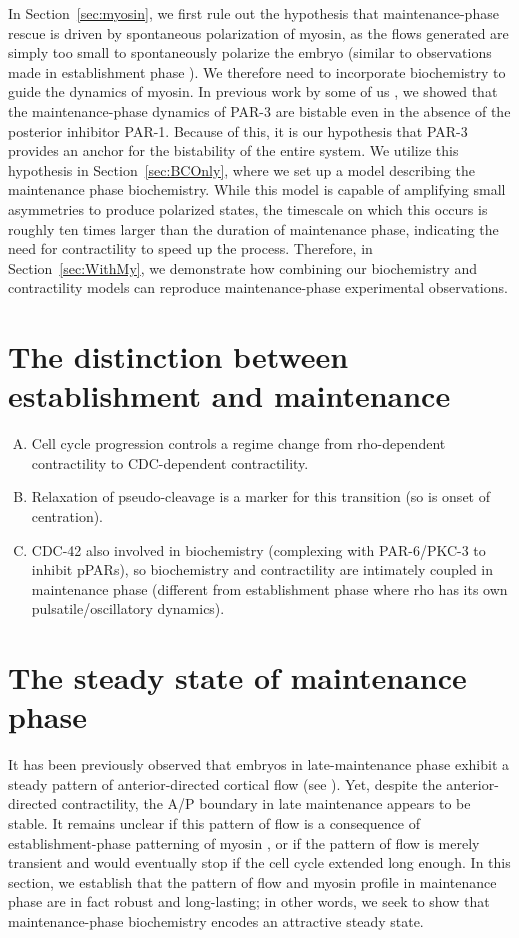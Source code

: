 \documentclass[11pt]{article}
\newcommand{\6}[1]{#1_{\text{6}}}
\newcommand{\3}[1]{#1_{\text{3}}}
\begin{document}
In Section\ \ref{sec:myosin}, we first rule out the hypothesis that maintenance-phase rescue is driven by spontaneous polarization of myosin, as the flows generated are simply too small to spontaneously polarize the embryo (similar to observations made in establishment phase \cite{nishikawa2017controlling}). We therefore need to incorporate biochemistry to guide the dynamics of myosin. In previous work by some of us \cite{lang2023oligomerization}, we showed that the maintenance-phase dynamics of PAR-3 are bistable even in the absence of the posterior inhibitor PAR-1. Because of this, it is our hypothesis that PAR-3 provides an anchor for the bistability of the entire system. We utilize this hypothesis in Section\ \ref{sec:BCOnly}, where we set up a model describing the maintenance phase biochemistry. While this model is capable of amplifying small asymmetries to produce polarized states, the timescale on which this occurs is roughly ten times larger than the duration of maintenance phase, indicating the need for contractility to speed up the process. Therefore, in Section\ \ref{sec:WithMy}, we demonstrate how combining our biochemistry and contractility models can reproduce maintenance-phase experimental observations.

\section{The distinction between establishment and maintenance}
\begin{enumerate}[(A)]
 \item Cell cycle progression controls a regime change from rho-dependent contractility to CDC-dependent contractility.
\item Relaxation of pseudo-cleavage is a marker for this transition (so is onset of centration).
\item CDC-42 also involved in biochemistry (complexing with PAR-6/PKC-3 to inhibit pPARs), so biochemistry and contractility are intimately coupled in maintenance phase (different from establishment phase where rho has its own pulsatile/oscillatory dynamics). 
\end{enumerate}

\section{The steady state of maintenance phase }
It has been previously observed that embryos in late-maintenance phase exhibit a steady pattern of anterior-directed cortical flow (see \cite[Fig.~2]{sailer2015dynamic}). Yet, despite the anterior-directed contractility, the A/P boundary in late maintenance appears to be stable. It remains unclear if this pattern of flow is a consequence of establishment-phase patterning of myosin \cite{munro2004cortical}, or if the pattern of flow is merely transient and would eventually stop if the cell cycle extended long enough. In this section, we establish that the pattern of flow and myosin profile in maintenance phase are in fact robust and long-lasting; in other words, we seek to show that maintenance-phase biochemistry encodes an attractive steady state. 
\end{document}
